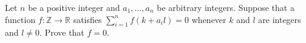 \documentclass{article}
\begin{document}
\setlength{\parindent}{0pt}
Let $n$ be a positive integer and $a_{1},\dots,a_{n}$ be arbitrary integers. Suppose that a function $f:\mathbb{Z}\to\mathbb{R}$ satisfies $\sum_{i=1}^{n}f(k+a_{i}l)=0$ whenever $k$ and $l$ are integers and $l\ne0$. Prove that $f=0$.
\end{document}
